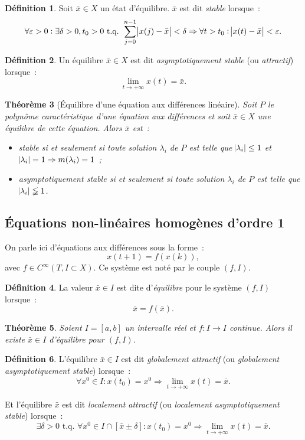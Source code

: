 \documentclass{article}
\newtheorem{thm}{Théorème}[section]
\theoremstyle{definition}
\newtheorem{déf}[thm]{Définition}
\theoremstyle{remark}
\newcommand{\tq}{\text{ t.q. }}
\begin{document}
	\begin{déf} Soit $\bar x \in X$ un état d'équilibre. $\bar x$ est dit \textit{stable} lorsque~:
	\[\forall \varepsilon > 0 : \exists \delta > 0, t_0 > 0 \tq \sum_{j=0}^{n-1}\abs {x(j)-\bar x} < \delta \Rightarrow
		\forall t > t_0 : \abs {x(t)-\bar x} < \varepsilon.\]
	\end{déf}

	\begin{déf} Un équilibre $\bar x \in X$ est dit \textit{asymptotiquement stable} (ou \textit{attractif}) lorsque~:
	\[\lim_{t \to +\infty}x(t) = \bar x.\]
	\end{déf}

	\begin{thm}[Équilibre d'une équation aux différences linéaire] Soit $P$ le polynôme caractéristique d'une équation aux différences et soit $\bar x \in X$ une
	équilibre de cette équation. Alors $\bar x$ est~:
	\begin{itemize}
		\item stable si et seulement si toute solution $\lambda_i$ de $P$ est telle que
		$\abs {\lambda_i} \leq 1$ et $\abs {\lambda_i} = 1 \Rightarrow m(\lambda_i) = 1$~;
		\item asymptotiquement stable si et seulement si toute solution $\lambda_i$ de $P$ est telle que $\abs {\lambda_i} \lneqq 1$.
	\end{itemize}
	\end{thm}

	\subsection{Équations non-linéaires homogènes d'ordre 1}

	On parle ici d'équations aux différences sous la forme~:
	\[x(t+1) = f(x(k)),\]
	avec $f \in C^\infty(T, I \subset X)$. Ce système est noté par le couple $(f, I)$.

	\begin{déf} La valeur $\bar x \in I$ est dite d'\textit{équilibre} pour le système $(f, I)$ lorsque~:
	\[\bar x = f(\bar x).\]
	\end{déf}

	\begin{thm} Soient $I = [a, b]$ un intervalle réel et $f : I \to I$ continue. Alors il existe $\bar x \in I$ d'équilibre pour $(f, I)$.
	\end{thm}

	\begin{déf} L'équilibre $\bar x \in I$ est dit \textit{globalement attractif} (ou \textit{globalement asymptotiquement stable}) lorsque~:
	\[\forall x^0 \in I : x(t_0) = x^0 \Rightarrow \lim_{t \to +\infty}x(t) = \bar x.\]

	Et l'équilibre $\bar x$ est dit \textit{localement attractif} (ou \textit{localement asymptotiquement stable}) lorsque~:
	\[\exists \delta > 0 \tq \forall x^0 \in I \cap [\bar x \pm \delta] : x(t_0) = x^0 \Rightarrow \lim_{t \to +\infty}x(t) = \bar x.\]
	\end{déf}
\end{document}
